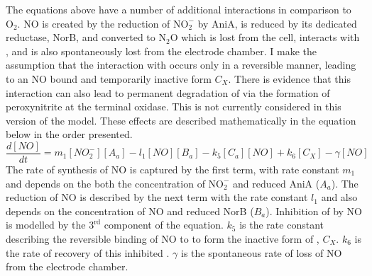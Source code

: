 The equations above have a number of additional interactions in comparison to $\mathrm{O}_2$. NO is created by the reduction of $\mathrm{NO}_\mathrm{2}^\mathrm{-}$ by AniA, is reduced by its dedicated reductase, NorB, and converted to $\mathrm{N}_2\mathrm{O}$ which is lost from the cell, interacts with \cbbthree{}, and is also spontaneously lost from the electrode chamber. I make the assumption that the interaction with \cbbthree{} occurs only in a reversible manner, leading to an NO bound and temporarily inactive form $C_X$. There is evidence that this interaction can also lead to permanent degradation of \cbbthree{} via the formation of peroxynitrite at the terminal oxidase. This is not currently considered in this version of the model. These effects are described mathematically in the equation below in the order presented.
\begin{equation}
\frac{d[NO]}{dt} = m_{1}[NO_2^-][A_a] - l_1[NO][B_a] - k_5[C_a][NO] + k_6 [C_X] - \gamma[NO]
\label{eq:no}
\end{equation}
The rate of synthesis of NO is captured by the first term, with rate constant $m_{1}$ and depends on the both the concentration of $\mathrm{NO}_\mathrm{2}^\mathrm{-}$ and reduced AniA ($A_a$). The reduction of NO is described by the next term with the rate constant $l_1$ and also depends on the concentration of NO and reduced NorB ($B_a$). Inhibition of \cbbthree{} by NO is modelled by the $\mathrm{3}^\mathrm{rd}$ component of the equation. $k_5$ is the rate constant describing the reversible binding of NO to \cbbthree{} to form the inactive form of \cbbthree{}, $C_X$. $k_6$ is the rate of recovery of this inhibited \cbbthree{}. $\gamma$ is the spontaneous rate of loss of NO from the electrode chamber.\\
